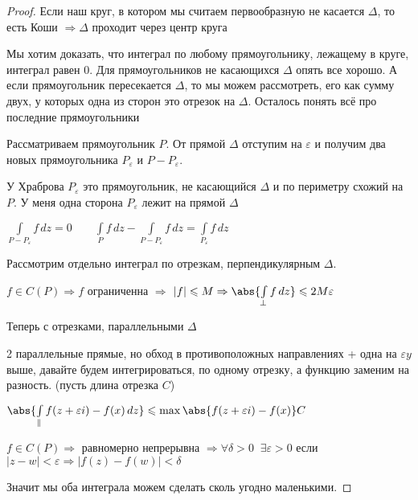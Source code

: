 \begin{proof}\thmslashn
	
	Если наш круг, в котором мы считаем первообразную не касается $\Delta$, то есть Коши $\Rightarrow \Delta$ проходит через центр круга
	 
	 Мы хотим доказать, что интеграл по любому прямоугольнику, лежащему в круге, интеграл равен 0. Для прямоугольников не касающихся $\Delta$ опять все хорошо. А если прямоугольник пересекается $\Delta$, то мы можем рассмотреть, его как сумму двух, у которых одна из сторон это отрезок на $\Delta$. Осталось понять всё про последние прямоугольники 
	 
	 Рассматриваем прямоугольник $P$. От прямой $\Delta$ отступим на $\varepsilon$ и получим два новых прямоугольника $P_\varepsilon$ и $P - P_\varepsilon$.
	 
	 \begin{remark_author}
	 	У Храброва $P_\varepsilon$ это прямоугольник, не касающийся $\Delta$ и по периметру схожий на $P$. У меня одна сторона $P_\varepsilon$ лежит на прямой $\Delta$
	 \end{remark_author}
	 
	 $\int\limits_{P - P_\varepsilon}f \,dz = 0 \qquad \int\limits_{P}f \,dz - \int\limits_{P - P_\varepsilon}f \,dz = \int\limits_{P_\varepsilon}f\,dz$
	 
	 Рассмотрим отдельно интеграл по отрезкам, перпендикулярным $\Delta$.
	  
	 $f\in C(P) \Rightarrow f$ ограниченна $\Rightarrow$ $|f| \leqslant M \Rightarrow \abs{\int\limits_{\perp} f\,dz} \leqslant 2M\varepsilon$ 
	 
	 Теперь с отрезками, параллельными $\Delta$
	 
	 2 параллельные прямые, но обход в противоположных направлениях + одна на $\varepsilon y$ выше, давайте будем интегрироваться, по одному отрезку, а функцию заменим на разность. (пусть длина отрезка $C$)
	 
	 $\abs{\int\limits_{\parallel}f(z + \varepsilon i) - f(x)\,dz}  \leqslant \max \abs{f(z + \varepsilon i) - f(x)} C$
	 
	 $f\in C(P) \Rightarrow$ равномерно непрерывна $\Rightarrow \forall \delta > 0 \;\; \exists \varepsilon > 0$ если $|z-w| < \varepsilon \Rightarrow |f(z) - f(w)| < \delta$ 
	
	Значит мы оба интеграла можем сделать сколь угодно маленькими.
	
\end{proof}

